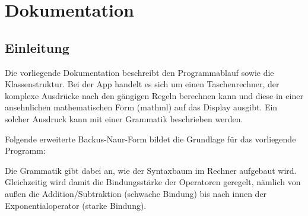 \part{Dokumentation}
\chapter{Einleitung}
Die vorliegende Dokumentation beschreibt den Programmablauf sowie die Klassenstruktur.
Bei der App handelt es sich um einen Taschenrechner, der komplexe Ausdrücke nach den gängigen Regeln berechnen kann und diese in einer ansehnlichen mathematischen Form (mathml) auf das Display ausgibt.
Ein solcher Ausdruck kann mit einer Grammatik beschrieben werden. 

Folgende erweiterte Backus-Naur-Form bildet die Grundlage für das vorliegende Programm:


Die Grammatik gibt dabei an, wie der Syntaxbaum im Rechner aufgebaut wird.
Gleichzeitig wird damit die Bindungsstärke der Operatoren geregelt, 
nämlich von außen die Addition/Subtraktion (schwache Bindung) bis nach innen der Exponentialoperator (starke Bindung). 


